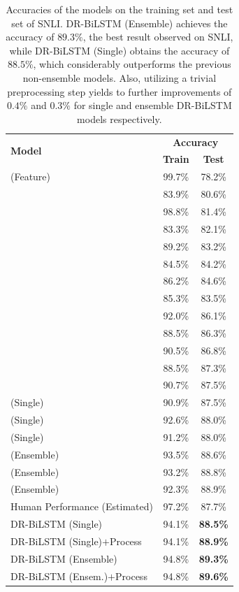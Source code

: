\documentclass[11pt,a4paper]{article}
\begin{document}
	\begin{table}[ht]
		\begin{center}
			\small
			\begin{tabular}{lcc}
				\hline
				\multirow{2}{*}{\textbf{Model}}& \multicolumn{2}{c}{\bf{Accuracy}} \\ \cline{2-3}
				& \textbf{Train}&\textbf{Test}\\ 
				\hline \hline
				\cite{snli} (Feature)&99.7\%&78.2\%\\ 
				\hline \hline
				\cite{snli}&83.9\%&80.6\%\\ 
				\cite{Vendrov2015}&98.8\%&81.4\%\\
				\cite{Mou2016}&83.3\%&82.1\%\\
				\cite{Bowman2016}&89.2\%&83.2\%\\
				\cite{Liu2016}&84.5\%&84.2\%\\
				\cite{nse2017}&86.2\%&84.6\%\\ 
				\hline\hline
				\cite{Rocktaschel2015}&85.3\%&83.5\%\\
				\cite{Wang2016}&92.0\%&86.1\%\\
				\cite{fusion2016}&88.5\%&86.3\%\\
				\cite{google2016}&90.5\%&86.8\%\\
				\cite{nti2017}&88.5\%&87.3\%\\
				\cite{re-read}&90.7\%&87.5\%\\
				\cite{ibm2017} (Single)&90.9\%&87.5\%\\
				\cite{him2017} (Single)&92.6\%&88.0\% \\
				\cite{gong2017} (Single)&91.2\%&88.0\% \\
				\hline \hline
				\cite{him2017} (Ensemble)&93.5\%&88.6\%\\
				\cite{ibm2017} (Ensemble)&93.2\%&88.8\%\\
				\cite{gong2017} (Ensemble)&92.3\%&88.9\%\\
				\hline \hline
				Human Performance (Estimated)&97.2\%&87.7\%\\
				\hline\hline
				DR-BiLSTM (Single)&94.1\%&\textbf{88.5\%} \\
				DR-BiLSTM (Single)$+$Process&94.1\%&\textbf{88.9\%} \\
				\hline
				DR-BiLSTM (Ensemble)&94.8\%&\textbf{89.3\%} \\
				DR-BiLSTM (Ensem.)$+$Process&94.8\%&\textbf{89.6\%} \\
				\hline
			\end{tabular}
		\end{center}
		\caption{\label{tab:snli:result} Accuracies of the models on the training set and test set of SNLI. DR-BiLSTM (Ensemble) achieves the accuracy of $89.3\%$, the best result observed on SNLI, while DR-BiLSTM (Single) obtains the accuracy of $88.5\%$, which considerably outperforms the previous non-ensemble models. Also, utilizing a trivial preprocessing step yields to further improvements of $0.4\%$ and $0.3\%$ for single and ensemble DR-BiLSTM models respectively.}
	\end{table}
	
\end{document}

